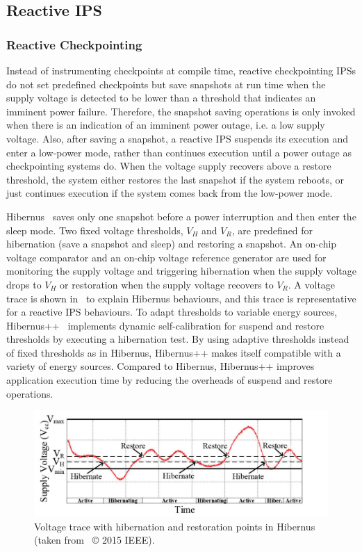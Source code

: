 \subsection{Reactive IPS} \label{Section:reactiveic}

\subsubsection{Reactive Checkpointing} 

Instead of instrumenting checkpoints at compile time, reactive checkpointing IPSs do not set predefined checkpoints but save snapshots at run time when the supply voltage is detected to be lower than a threshold that indicates an imminent power failure. 
Therefore, the snapshot saving operations is only invoked when there is an indication of an imminent power outage, i.e. a low supply voltage. 
Also, after saving a snapshot, a reactive IPS suspends its execution and enter a low-power mode, rather than continues execution until a power outage as checkpointing systems do. 
When the voltage supply recovers above a restore threshold, the system either restores the last snapshot if the system reboots, or just continues execution if the system comes back from the low-power mode.

Hibernus~\cite{balsamo2015hibernus} saves only one snapshot before a power interruption and then enter the sleep mode. 
Two fixed voltage thresholds, $V_H$ and $V_R$, are predefined for hibernation (save a snapshot and sleep) and restoring a snapshot. 
An on-chip voltage comparator and an on-chip voltage reference generator are used for monitoring the supply voltage and triggering hibernation when the supply voltage drops to $V_H$ or restoration when the supply voltage recovers to $V_R$. 
A voltage trace is shown in~ to explain Hibernus behaviours, and this trace is representative for a reactive IPS behaviours. 
To adapt thresholds to variable energy sources, Hibernus++~\cite{balsamo2016hibernus++} implements dynamic self-calibration for suspend and restore thresholds by executing a hibernation test. 
By using adaptive thresholds instead of fixed thresholds as in Hibernus, Hibernus++ makes itself compatible with a variety of energy sources. 
Compared to Hibernus, Hibernus++ improves application execution time by reducing the overheads of suspend and restore operations.

\begin{figure}
    \centering
    \includegraphics[width=\columnwidth]{ch2_review/figures/hibernus}
    \caption{Voltage trace with hibernation and restoration points in Hibernus (taken from \cite{balsamo2015hibernus}~© 2015 IEEE).}
    \label{Figure:hibernus}
\end{figure}

